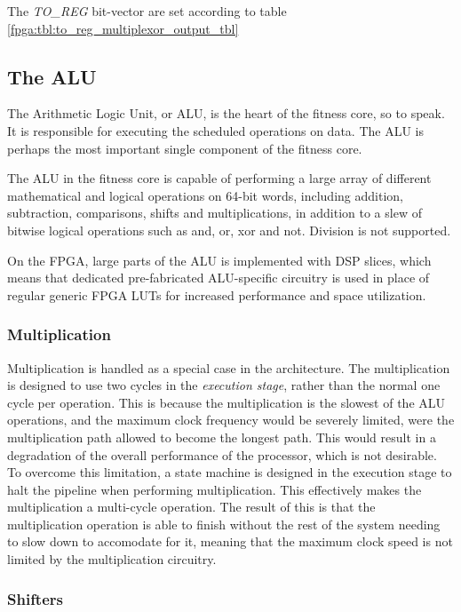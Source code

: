 The \emph{TO\_REG} bit-vector are set according to table \ref{fpga:tbl:to_reg_multiplexor_output_tbl}




\subsection{The ALU}

The Arithmetic Logic Unit, or ALU, is the heart of the fitness core, so to speak.
It is responsible for executing the scheduled operations on data.
The ALU is perhaps the most important single component of the fitness core.

The ALU in the fitness core is capable of performing a large array of different mathematical and logical operations on 64-bit words, including addition, subtraction, comparisons, shifts and multiplications, in addition to a slew of bitwise logical operations such as and, or, xor and not.
Division is not supported.

On the FPGA, large parts of the ALU is implemented with \glspl{DSP slice}, which means that dedicated pre-fabricated ALU-specific circuitry is used in place of regular generic \gls{FPGA} \glspl{LUT} for increased performance and space utilization.

\subsubsection{Multiplication}

Multiplication is handled as a special case in the architecture.
The multiplication is designed to use two cycles in the \emph{execution stage}, rather than the normal one cycle per operation.
This is because the multiplication is the slowest of the ALU operations, and the maximum clock frequency would be severely limited, were the multiplication path allowed to become the longest path.
This would result in a degradation of the overall performance of the processor, which is not desirable.
To overcome this limitation, a state machine is designed in the execution stage to halt the pipeline when performing multiplication.
This effectively makes the multiplication a multi-cycle operation.
The result of this is that the multiplication operation is able to finish without the rest of the system needing to slow down to accomodate for it, meaning that the maximum clock speed is not limited by the multiplication circuitry.

\subsubsection{Shifters}

